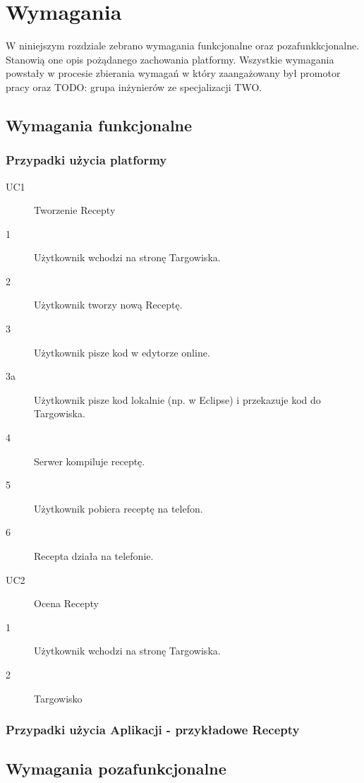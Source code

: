 \documentclass[11pt,a4paper,polish,thesis]{dcsbook}
\begin{document}
\chapter{Wymagania}
W niniejszym rozdziale zebrano wymagania funkcjonalne oraz pozafunkkcjonalne. Stanowią one opis pożądanego zachowania platformy. Wszystkie wymagania powstały
w procesie zbierania wymagań w który zaangażowany był promotor pracy oraz TODO: grupa inżynierów ze specjalizacji TWO.
\section{Wymagania funkcjonalne}
\subsection{Przypadki użycia platformy} %
\begin{description}
\item[UC1] Tworzenie Recepty
\item[1] Użytkownik wchodzi na stronę Targowiska.
\item[2]Użytkownik tworzy nową Receptę.
\item[3]Użytkownik pisze kod w edytorze online.
\item[3a]Użytkownik pisze kod lokalnie (np. w Eclipse) i przekazuje kod do Targowiska.
\item[4]Serwer kompiluje receptę.
\item[5]Użytkownik pobiera receptę na telefon.
\item[6]Recepta działa na telefonie.

\item[UC2] Ocena Recepty
\item[1] Użytkownik wchodzi na stronę Targowiska.
\item[2] Targowisko  


\end{description}
\subsection{Przypadki użycia Aplikacji - przykładowe Recepty}
\section{Wymagania pozafunkcjonalne}
\end{document}
